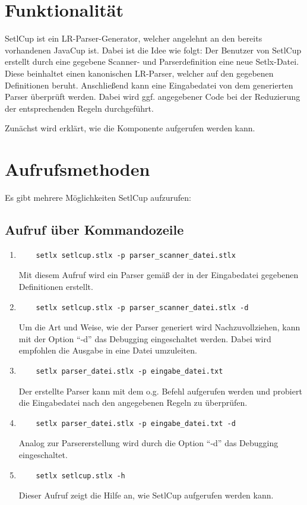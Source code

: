 \chapter{Funktionalität}
SetlCup ist ein LR-Parser-Generator, welcher angelehnt an den bereits vorhandenen JavaCup ist.
Dabei ist die Idee wie folgt:
Der Benutzer von SetlCup erstellt durch eine gegebene Scanner- und Parserdefinition eine neue Setlx-Datei. Diese beinhaltet einen kanonischen LR-Parser, welcher auf den gegebenen Definitionen beruht. Anschließend kann eine Eingabedatei von dem generierten Parser überprüft werden. Dabei wird ggf. angegebener Code bei der Reduzierung der entsprechenden Regeln durchgeführt. 

Zunächst wird erklärt, wie die Komponente aufgerufen werden kann.
\chapter{Aufrufsmethoden}
Es gibt mehrere Möglichkeiten SetlCup aufzurufen:
\section{Aufruf über Kommandozeile}
\begin{enumerate}
	\item \begin{Verbatim}
	setlx setlcup.stlx -p parser_scanner_datei.stlx
	\end{Verbatim}
			Mit diesem Aufruf wird ein Parser gemäß der in der Eingabedatei gegebenen Definitionen erstellt.
	\item \begin{Verbatim}
	setlx setlcup.stlx -p parser_scanner_datei.stlx -d
	\end{Verbatim}
			Um die Art und Weise, wie der Parser generiert wird Nachzuvollziehen, kann mit der Option "`-d"' das Debugging eingeschaltet werden. Dabei wird empfohlen die Ausgabe in eine Datei umzuleiten.
	\item \begin{Verbatim}
	setlx parser_datei.stlx -p eingabe_datei.txt
	\end{Verbatim}
	Der erstellte Parser kann mit dem o.g. Befehl aufgerufen werden und probiert die Eingabedatei nach den angegebenen Regeln zu überprüfen.
		\item \begin{Verbatim}
	setlx parser_datei.stlx -p eingabe_datei.txt -d
	\end{Verbatim}
	Analog zur Parsererstellung wird durch die Option "`-d"' das Debugging eingeschaltet.
	\item \begin{Verbatim}
	setlx setlcup.stlx -h
	\end{Verbatim}
			Dieser Aufruf zeigt die Hilfe an, wie SetlCup aufgerufen werden kann.
\end{enumerate}
